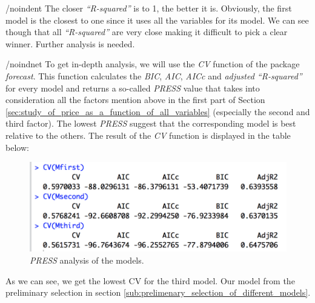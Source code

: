 /noindent
The closer \emph{``R-squared''} is to 1, the better it is. Obviously, the 
first model is the closest to one since it uses all the variables for its model. We can see though that all \emph{``R-squared''} are very close making it difficult to pick a clear winner. Further analysis is needed.

/noindnet
To get in-depth analysis, we will use the \textit{CV} function of the package \textit{forecast}. This function calculates the \emph{BIC}, \emph{AIC}, \emph{AICc} and \emph{adjusted ``R-squared''} for every model and returns 
a so-called \emph{PRESS} value that takes into consideration all the factors mention above in the first part of Section \ref{sec:study_of_price_as_a_function_of_all_variables} (especially the second and third factor). The lowest \emph{PRESS} suggest that the corresponding model is best relative to the others. The result of the \textit{CV} function is displayed in the table below:

\begin{figure}[H]
  \begin{center}
    \includegraphics[scale=0.7]{./img/CV_analysis.png}
    \end{center}
  \caption{\textit{PRESS} analysis of the models.}
  \label{fig:PRESS}
\end{figure}

As we can see, we get the lowest CV for the third model. Our model from the preliminary selection in section \ref{sub:prelimenary_selection_of_different_models}.



